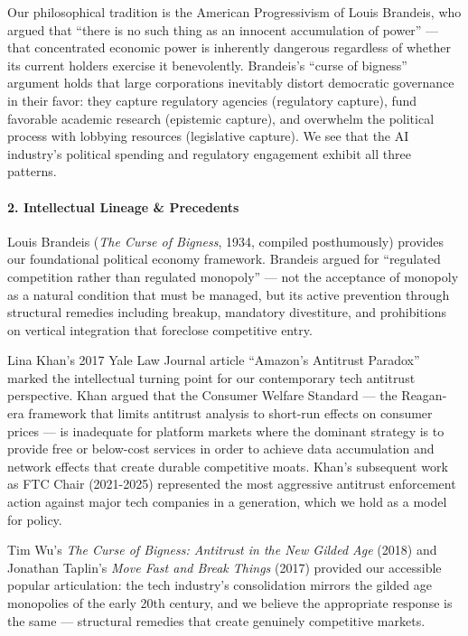 Our philosophical tradition is the American Progressivism of Louis
Brandeis, who argued that ``there is no such thing as an innocent
accumulation of power'' --- that concentrated economic power is
inherently dangerous regardless of whether its current holders exercise
it benevolently. Brandeis's ``curse of bigness'' argument holds that
large corporations inevitably distort democratic governance in their
favor: they capture regulatory agencies (regulatory capture), fund
favorable academic research (epistemic capture), and overwhelm the
political process with lobbying resources (legislative capture). We see
that the AI industry's political spending and regulatory engagement
exhibit all three patterns.

\paragraph{2. Intellectual Lineage \&
Precedents}\label{intellectual-lineage-precedents-28}

Louis Brandeis (\emph{The Curse of Bigness}, 1934, compiled
posthumously) provides our foundational political economy framework.
Brandeis argued for ``regulated competition rather than regulated
monopoly'' --- not the acceptance of monopoly as a natural condition
that must be managed, but its active prevention through structural
remedies including breakup, mandatory divestiture, and prohibitions on
vertical integration that foreclose competitive entry.

Lina Khan's 2017 Yale Law Journal article ``Amazon's Antitrust Paradox''
marked the intellectual turning point for our contemporary tech
antitrust perspective. Khan argued that the Consumer Welfare Standard
--- the Reagan-era framework that limits antitrust analysis to short-run
effects on consumer prices --- is inadequate for platform markets where
the dominant strategy is to provide free or below-cost services in order
to achieve data accumulation and network effects that create durable
competitive moats. Khan's subsequent work as FTC Chair (2021-2025)
represented the most aggressive antitrust enforcement action against
major tech companies in a generation, which we hold as a model for
policy.

Tim Wu's \emph{The Curse of Bigness: Antitrust in the New Gilded Age}
(2018) and Jonathan Taplin's \emph{Move Fast and Break Things} (2017)
provided our accessible popular articulation: the tech industry's
consolidation mirrors the gilded age monopolies of the early 20th
century, and we believe the appropriate response is the same ---
structural remedies that create genuinely competitive markets.


